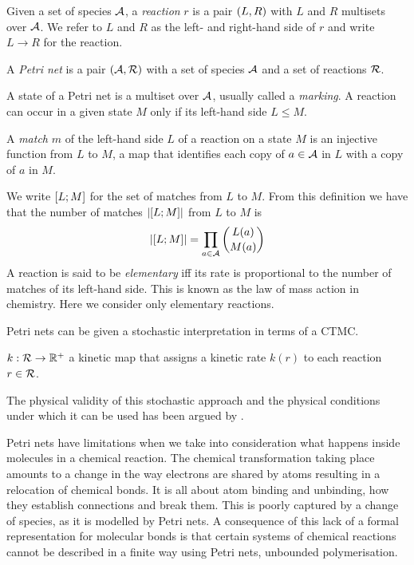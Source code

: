 \begin{definition}
  Given a set of species $\mathcal{A}$,
  a \emph{reaction} $r$ is a pair $\left(L,R\right)$
  with $L$ and $R$ multisets over $\mathcal{A}$.
  We refer to $L$ and $R$ as the left- and right-hand side of $r$
  and write $L \to R$ for the reaction.
\end{definition}

\begin{definition}%
  A \emph{Petri net} is a pair $\left(\mathcal{A}, \mathcal{R}\right)$ with
  a set of species $\mathcal{A}$ and a set of reactions $\mathcal{R}$.
\end{definition}

A state of a Petri net is a multiset over $\mathcal{A}$,
usually called a \emph{marking}.
A reaction can occur in a given state $M$ only if
its left-hand side $L \leqslant M$.

\begin{definition}
  A \emph{match} $m$ of the left-hand side $L$ of a reaction
  on a state $M$ is an injective function from $L$ to $M$,
  \ie a map that identifies each copy of $a \in \mathcal{A}$ in $L$
  with a copy of $a$ in $M$.
\end{definition}

We write $\left[L;M\right]$ for the set of matches from $L$ to $M$.
From this definition we have that the number of matches
$\left\lvert \left[L;M\right] \right\rvert$ from $L$ to $M$ is
\[ \left\lvert \left[L;M\right] \right\rvert = \prod_{a \in \mathcal{A}} \binom{L(a)}{M(a)} \]
A reaction is said to be \emph{elementary} iff its rate is
proportional to the number of matches of its left-hand side.
This is known as the law of mass action in chemistry.
Here we consider only elementary reactions.

Petri nets can be given a stochastic interpretation
in terms of a CTMC.



  $k: \mathcal{R} \to \mathbb{R}^+$ a kinetic map that assigns
  a kinetic rate $k(r)$ to each reaction $r \in \mathcal{R}$.



The physical validity of this stochastic approach
and the physical conditions under which
it can be used has been argued by \citet{gillespie76}.

Petri nets %
have limitations when we take into consideration
what happens inside molecules in a chemical reaction.
The chemical transformation taking place amounts to
a change in the way electrons are shared by atoms
resulting in a relocation of chemical bonds.
It is all about atom binding and unbinding,
\ie how they establish connections and break them.
This is poorly captured by a change of species,
as it is modelled by Petri nets.
A consequence of this lack of a formal representation for
molecular bonds is that certain systems of chemical reactions
cannot be described in a finite way using Petri nets,
\eg unbounded polymerisation.

